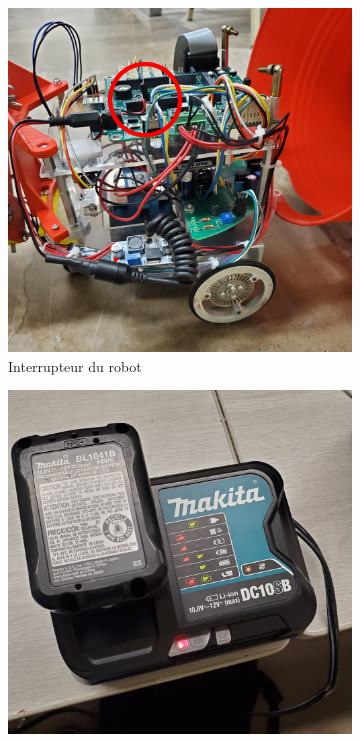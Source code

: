 \begin{figure}[h!]
    \begin{subfigure}{0.3\linewidth}
        \centering
        \includegraphics[width=\linewidth]{img/a1/interrupteur}
        \caption{Interrupteur du robot}
        \label{fig:a1-interrupteur}
    \end{subfigure}
    \begin{subfigure}{0.3\linewidth}
        \centering
        \includegraphics[width=\linewidth]{img/a1/chargeur-batterie}

\end{subfigure}
\end{figure}
